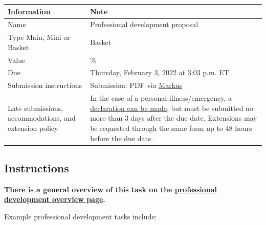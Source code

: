 \documentclass[
  openany]{book}
\begin{document}
\begin{longtable}[]{@{}
  >{\raggedright\arraybackslash}p{}
  >{\raggedright\arraybackslash}p{}@{}}
\toprule
\textbf{Information} & \textbf{Note} \\
\midrule
\endhead
Name & Professional development proposal \\
Type Main, Mini or Basket & Basket \\
Value & 1\% \\
Due & Thursday, February 3, 2022 at 3:03 p.m. ET \\
Submission instructions & Submission: PDF via \href{https://markus-ds.teach.cs.toronto.edu/}{Markus} \\
Late submissions, accommodations, and extension policy & In the case of a personal illness/emergency, a \href{https://forms.office.com/Pages/ResponsePage.aspx?id=JsKqeAMvTUuQN7RtVsVSEOKHUU3SzAJJhmOKjJhDWEpUNTFDSzhZTFlXUzVYMVlNM1FEUTRZMkVWOC4u}{declaration can be made}, but must be submitted no more than 3 days after the due date. Extensions may be requested through the same form up to 48 hours before the due date. \\
\bottomrule
\end{longtable}

\hypertarget{instructions-4}{%
\subsection{Instructions}\label{instructions-4}}

\textbf{There is a general overview of this task on the \href{https://q.utoronto.ca/courses/204826/pages/professional-development}{professional development overview page}.}

Example professional development tasks include:
\end{document}
